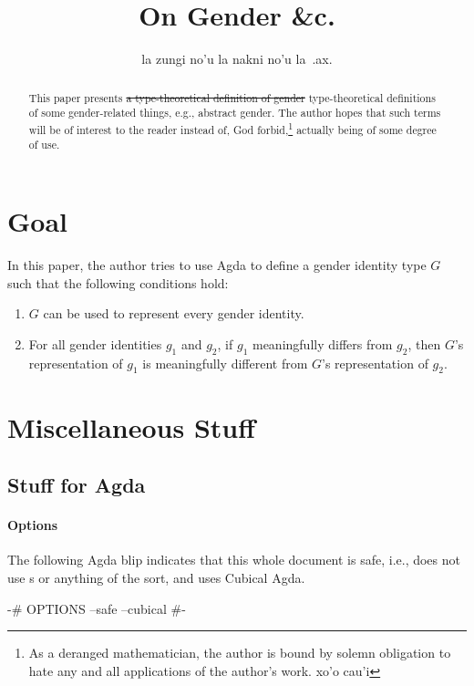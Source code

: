 \documentclass{article}
\title{On Gender \&c.}
\author{la zungi no'u la nakni no'u la\ .ax.}
\theoremstyle{remark}
\begin{document}
\maketitle{}

\begin{abstract}
\sloppypar{}
This paper presents \st{a type-theoretical definition of gender} type-theoretical definitions of some gender-related things, e.g., abstract gender.  The author hopes that such terms will be of interest to the reader instead of, God forbid,\footnote{As a deranged mathematician, the author is bound by solemn obligation to hate any and all applications of the author's work.  xo'o cau'i} actually being of some degree of use.
\end{abstract}

\section{Goal}
In this paper, the author tries to use Agda to define a gender identity type \(G\) such that the following conditions hold:

\begin{enumerate}
  \item \(G\) can be used to represent every gender identity.
  \item For all gender identities \(g_1\) and \(g_2\), if \(g_1\) meaningfully differs from \(g_2\), then \(G\)'s representation of \(g_1\) is meaningfully different from \(G\)'s representation of \(g_2\).\label{enum:specRuleRepresentationDifference}
\end{enumerate}

\section{Miscellaneous Stuff}

\subsection{Stuff for Agda}

\paragraph{Options}
The following Agda blip indicates that this whole document is safe, i.e., does not use s or anything of the sort, and uses Cubical Agda.

\begin{code}
{-# OPTIONS --safe --cubical #-}
\end{code}
\end{document}
